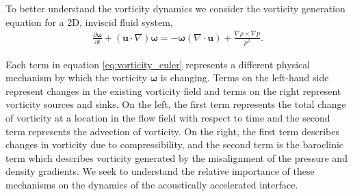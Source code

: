 \documentclass{jfm}%
\begin{document}
To better understand the vorticity dynamics we consider the vorticity
generation equation for a 2D, inviscid fluid system,
\begin{align} \label{eq:vorticity_euler}
  \frac{\partial \boldsymbol{\omega}}{\partial t}+\left(\boldsymbol{u}\cdot\nabla\right)\boldsymbol{\omega} =%
  - \boldsymbol{\omega}\left(\nabla\cdot\boldsymbol{u}\right) + \frac{\nabla\rho\times\nabla p}{\rho^2}.%
\end{align}

Each term in equation \eqref{eq:vorticity_euler} represents a
different physical mechanism by which the vorticity
$\boldsymbol{\omega}$ is changing. Terms on the left-hand side
represent changes in the existing vorticity field and terms on the
right represent vorticity sources and sinks. On the left, the first
term represents the total change of vorticity at a location in the
flow field with respect to time and the second term represents the
advection of vorticity. On the right, the first term describes changes
in vorticity due to compressibility, and the second term is the
baroclinic term which describes vorticity generated by the
misalignment of the pressure and density gradients. We
seek to understand the relative importance of these mechanisms on the
dynamics of the acoustically accelerated interface.
% 
% 
\end{document}
